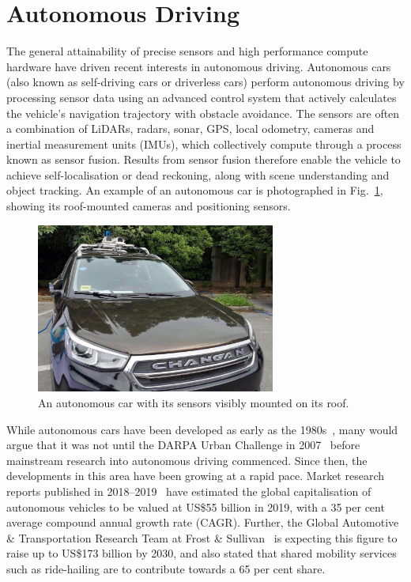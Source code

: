 \section{Autonomous Driving}
The general attainability of precise sensors and high performance compute hardware have driven recent interests in autonomous driving. Autonomous cars (also known as self-driving cars or driverless cars) perform autonomous driving by processing sensor data using an advanced control system that actively calculates the vehicle's navigation trajectory with obstacle avoidance. The sensors are often a combination of LiDARs, radars, sonar, GPS, local odometry, cameras and inertial measurement units (IMUs), which collectively compute through a process known as sensor fusion. Results from sensor fusion therefore enable the vehicle to achieve self-localisation or dead reckoning, along with scene understanding and object tracking. An example of an autonomous car is photographed in Fig.~\ref{fig:1:av}, showing its roof-mounted cameras and positioning sensors. 

\begin{figure}[ht] 
	\centering    
	\includegraphics[width=0.7\textwidth]{av}
	\caption{An autonomous car with its sensors visibly mounted on its roof.}
	\label{fig:1:av}
\end{figure}

While autonomous cars have been developed as early as the 1980s~\cite{dickmanns_autonomous_1987}, many would argue that it was not until the DARPA Urban Challenge in 2007~\cite{buehler_darpa_2009} before mainstream research into autonomous driving commenced. Since then, the developments in this area have been growing at a rapid pace. Market research reports published in 2018--2019~\cite{grand_view_research_self-driving_2018, kumar_autonomous_2018, htf_market_intelligence_overview_2019} have estimated the global capitalisation of autonomous vehicles to be valued at US\$55 billion in 2019, with a 35 per cent average compound annual growth rate (CAGR). Further, the Global Automotive \& Transportation Research Team at Frost \& Sullivan~\cite{frost_&_sullivan_global_2018} is expecting this figure to raise up to US\$173 billion by 2030, and also stated that shared mobility services such as ride-hailing are to contribute towards a 65 per cent share. 

